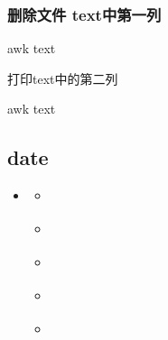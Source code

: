 \documentclass[letterpaper,10pt,english]{sphinxmanual}
\begin{document}
\subsubsection{删除文件 text中第一列}
\label{\detokenize{scripts/shell/awk:text}}
%
\begin{sphinxVerbatim}[commandchars=\\\{\}]
awk  text
\end{sphinxVerbatim}

打印text中的第二列

%
\begin{sphinxVerbatim}[commandchars=\\\{\}]
awk  text
\end{sphinxVerbatim}


\subsection{date}
\label{\detokenize{scripts/shell/date:date}}\label{\detokenize{scripts/shell/date::doc}}
\begin{sphinxShadowBox}
\begin{itemize}
\item {} 
\label{\detokenize{scripts/shell/date:id6}}{\hyperref[\detokenize{scripts/shell/date:date}]{}}
\begin{itemize}
\item {} 
\label{\detokenize{scripts/shell/date:id7}}{\hyperref[\detokenize{scripts/shell/date:id1}]{}}

\item {} 
\label{\detokenize{scripts/shell/date:id8}}{\hyperref[\detokenize{scripts/shell/date:id2}]{}}

\item {} 
\label{\detokenize{scripts/shell/date:id9}}{\hyperref[\detokenize{scripts/shell/date:id3}]{}}

\item {} 
\label{\detokenize{scripts/shell/date:id10}}{\hyperref[\detokenize{scripts/shell/date:id4}]{}}

\item {} 
\label{\detokenize{scripts/shell/date:id11}}{\hyperref[\detokenize{scripts/shell/date:id5}]{}}

\end{itemize}

\end{itemize}
\end{sphinxShadowBox}
\end{document}
